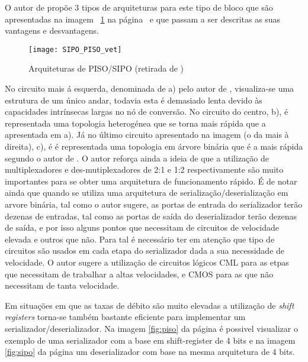 O autor de \cite{R012} propõe 3 tipos de arquiteturas para este tipo de bloco que são apresentadas na imagem ~\ref{fig:PISO-SIPO} na página~\pageref{fig:PISO-SIPO} e que passam a ser descritas as suas vantagens e desvantagens.


	\begin{figure}[h!]
	\begin{center}
		\leavevmode
		\texttt{[image: SIPO\_PISO\_vet]}
		\caption[Arquiteturas de PISO/SIPO]{Arquiteturas de PISO/SIPO (retirada de \cite{R012})}
		\label{fig:PISO-SIPO}
	\end{center}
\end{figure}

No circuito mais á esquerda, denominada de a) pelo autor de \cite{R012}, visualiza-se uma estrutura de um único andar, todavia esta é demasiado lenta devido às capacidades intrínsecas largas no nó de conversão. No circuito do centro, b), é representada uma topologia  heterogénea que se torna mais rápida que a apresentada em a). Já no último circuito apresentado na imagem (o da mais à direita), c), é é representada uma topologia em árvore binária que é a mais rápida segundo o autor de \cite{R012}. O autor reforça ainda a ideia de que a utilização de multiplexadores e des-mutiplexadores de 2:1 e 1:2 respectivamente são muito importantes para se obter uma arquitetura de funcionamento rápido. É de notar ainda que quando se utiliza uma arquitetura de serialização/deserialização em arvore binária, tal como o autor sugere, as portas de entrada do serializador terão dezenas de entradas, tal como as portas de saída do deserializador terão dezenas de saída, e por isso alguns pontos que necessitam de circuitos de velocidade elevada e outros que não. Para tal é necessário ter em atenção que tipo de circuitos são usados em cada etapa do serializador dada a sua necessidade de velocidade. O autor sugere a utilização de circuitos lógicos CML para as etpas que necessitam de trabalhar a altas velocidades, e CMOS para as que não necessitam de tanta velocidade.

Em situações em que as taxas de débito são muito elevadas a utilização de \textit{shift registers} torna-se também bastante eficiente para implementar um serializador/deserializador. Na imagem \ref{fig:piso} da página \pageref{fig:piso} é possivel visualizar o exemplo de uma serializador com a base em shift-register de 4 bits e na imagem \ref{fig:sipo} da página \pageref{fig:piso} um deserializador com base na mesma arquitetura de 4 bits.

